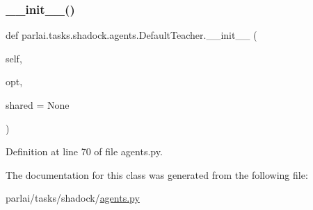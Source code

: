 \subsubsection{\texorpdfstring{\+\_\+\+\_\+init\+\_\+\+\_\+()}{\_\_init\_\_()}}
{\footnotesize\ttfamily def parlai.\+tasks.\+shadock.\+agents.\+Default\+Teacher.\+\_\+\+\_\+init\+\_\+\+\_\+ (\begin{DoxyParamCaption}\item[{}]{self,  }\item[{}]{opt,  }\item[{}]{shared = {\ttfamily None} }\end{DoxyParamCaption})}



Definition at line 70 of file agents.\+py.




The documentation for this class was generated from the following file\+:\begin{DoxyCompactItemize}
\item 
parlai/tasks/shadock/\hyperlink{parlai_2tasks_2shadock_2agents_8py}{agents.\+py}\end{DoxyCompactItemize}
